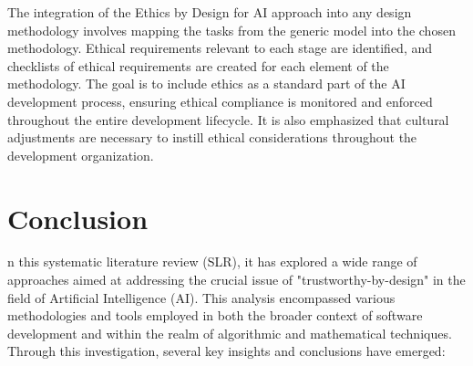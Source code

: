 \documentclass{article}
\begin{document}
The integration of the Ethics by Design for AI approach into any design methodology involves mapping the tasks from the generic model into the chosen methodology. Ethical requirements relevant to each stage are identified, and checklists of ethical requirements are created for each element of the methodology. The goal is to include ethics as a standard part of the AI development process, ensuring ethical compliance is monitored and enforced throughout the entire development lifecycle. It is also emphasized that cultural adjustments are necessary to instill ethical considerations throughout the development organization.

\newpage
\section{Conclusion}
n this systematic literature review (SLR), it has explored a wide range of approaches aimed at addressing the crucial issue of "trustworthy-by-design" in the field of Artificial Intelligence (AI). This analysis encompassed various methodologies and tools employed in both the broader context of software development and within the realm of algorithmic and mathematical techniques. \\
Through this investigation, several key insights and conclusions have emerged:
\end{document}
